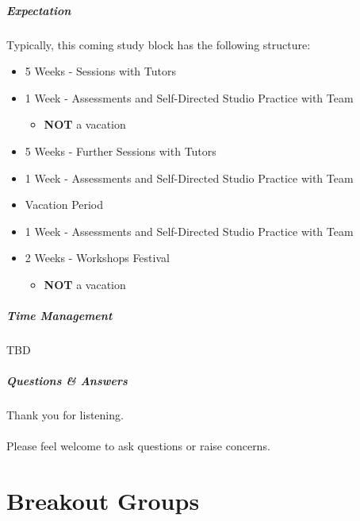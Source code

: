 \begin{frame}
	\frametitle{Expectation}
	
	Typically, this coming study block has the following structure:
	
	\begin{itemize}
		\item 5 Weeks - Sessions with Tutors
		\item 1 Week - Assessments and Self-Directed Studio Practice with Team
		\begin{itemize}
			\item \textbf{NOT} a vacation
		\end{itemize}
		\item 5 Weeks - Further Sessions with Tutors
		\item 1 Week - Assessments and Self-Directed Studio Practice with Team
		\item Vacation Period
		\item 1 Week - Assessments  and Self-Directed Studio Practice with Team
		\item 2 Weeks - Workshops Festival
		\begin{itemize}
			\item \textbf{NOT} a vacation
		\end{itemize}
	\end{itemize}
	
\end{frame}


\begin{frame}
	\frametitle{Time Management}
	
	TBD
	
\end{frame}

\begin{frame}
	\frametitle{Questions \& Answers}	
	\begin{center}
		Thank you for listening. 
		\\~\\
		Please feel welcome to ask questions or raise concerns.
	\end{center}
\end{frame}

\part{Breakout Groups}
\frame{\partpage}

